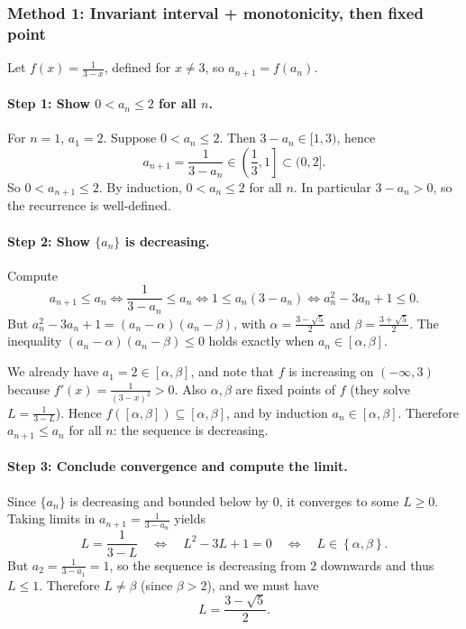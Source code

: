 \documentclass[12pt]{article}
\begin{document}
\subsubsection*{Method 1: Invariant interval + monotonicity, then fixed point}

Let \(f(x)=\frac{1}{3-x}\), defined for \(x\neq 3\), so \(a_{n+1}=f(a_n)\).

\paragraph{Step 1: Show \(0<a_n\le 2\) for all \(n\).}
For \(n=1\), \(a_1=2\). Suppose \(0<a_n\le 2\). Then \(3-a_n\in[1,3)\), hence
\[
a_{n+1}=\frac{1}{3-a_n}\in\left( \frac{1}{3}, 1\right]\subset (0,2].
\]
So \(0<a_{n+1}\le 2\). By induction, \(0<a_n\le 2\) for all \(n\). In particular \(3-a_n>0\), so the recurrence is well-defined.

\paragraph{Step 2: Show \(\{a_n\}\) is decreasing.}
Compute
\[
a_{n+1}\le a_n
\iff \frac{1}{3-a_n}\le a_n
\iff 1\le a_n(3-a_n)
\iff a_n^2-3a_n+1\le 0.
\]
But \(a_n^2-3a_n+1=(a_n-\alpha)(a_n-\beta)\), with \(\alpha=\frac{3-\sqrt{5}}{2}\) and \(\beta=\frac{3+\sqrt{5}}{2}\).
The inequality \((a_n-\alpha)(a_n-\beta)\le 0\) holds exactly when \(a_n\in[\alpha,\beta]\).

We already have \(a_1=2\in[\alpha,\beta]\), and note that \(f\) is increasing on \((-\infty,3)\) because \(f'(x)=\frac{1}{(3-x)^2}>0\). Also \(\alpha,\beta\) are fixed points of \(f\) (they solve \(L=\frac{1}{3-L}\)). Hence \(f([\alpha,\beta])\subseteq[\alpha,\beta]\), and by induction \(a_n\in[\alpha,\beta]\). Therefore \(a_{n+1}\le a_n\) for all \(n\): the sequence is decreasing.

\paragraph{Step 3: Conclude convergence and compute the limit.}
Since \(\{a_n\}\) is decreasing and bounded below by \(0\), it converges to some \(L\ge 0\).
Taking limits in \(a_{n+1}=\frac{1}{3-a_n}\) yields
\[
L=\frac{1}{3-L}\quad\Longleftrightarrow\quad L^2-3L+1=0
\quad\Longleftrightarrow\quad
L\in\left\{\alpha,\beta\right\}.
\]
But \(a_2=\frac{1}{3-a_1}=1\), so the sequence is decreasing from \(2\) downwards and thus \(L\le 1\). Therefore \(L\neq \beta\) (since \(\beta>2\)), and we must have
\[
\boxed{L=\frac{3-\sqrt{5}}{2}.}
\]
\end{document}
